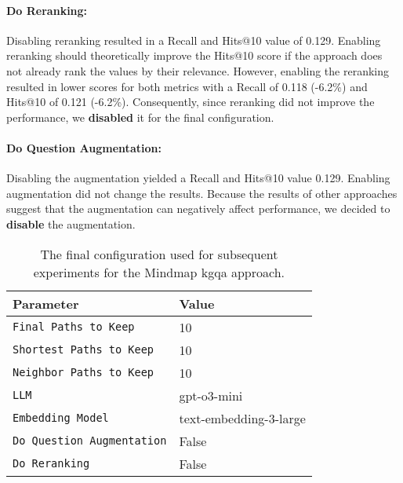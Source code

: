 \paragraph{Do Reranking:}
Disabling reranking resulted in a Recall and Hits@10 value of 0.129. Enabling reranking should theoretically improve the Hits@10 score if the approach does not already rank the values by their relevance. However, enabling the reranking resulted in lower scores for both metrics with a Recall of 0.118 (-6.2\%) and Hits@10 of 0.121 (-6.2\%). Consequently, since reranking did not improve the performance, we \textbf{disabled} it for the final configuration.

\paragraph{Do Question Augmentation:}
Disabling the augmentation yielded a Recall and Hits@10 value 0.129. Enabling augmentation did not change the results. Because the results of other approaches suggest that the augmentation can negatively affect performance, we decided to \textbf{disable} the augmentation.

\begin{table}[t]
    \centering
    \begin{tabular}{l l}   
        \toprule
        \textbf{Parameter} & \textbf{Value} \\
        \midrule
        \texttt{Final Paths to Keep} & 10 \\
        \texttt{Shortest Paths to Keep} & 10 \\
        \texttt{Neighbor Paths to Keep} & 10 \\
        \texttt{LLM} & gpt-o3-mini \\
        \texttt{Embedding Model} & text-embedding-3-large \\ 
        \texttt{Do Question Augmentation} & False \\
        \texttt{Do Reranking} & False \\
        \bottomrule
    \end{tabular}
    \caption[Final Configuration for Mindmap]{The final configuration used for subsequent experiments for the Mindmap \gls{kgqa} approach.}
    \label{tab:mindmap_final_config}
\end{table}